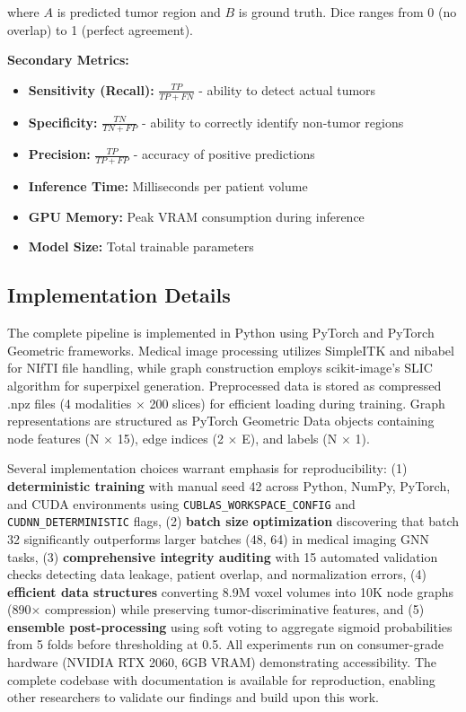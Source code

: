 where $A$ is predicted tumor region and $B$ is ground truth. Dice ranges from 0 (no overlap) to 1 (perfect agreement).

\textbf{Secondary Metrics:}
\begin{itemize}
    \item \textbf{Sensitivity (Recall):} $\frac{TP}{TP + FN}$ - ability to detect actual tumors
    \item \textbf{Specificity:} $\frac{TN}{TN + FP}$ - ability to correctly identify non-tumor regions
    \item \textbf{Precision:} $\frac{TP}{TP + FP}$ - accuracy of positive predictions
    \item \textbf{Inference Time:} Milliseconds per patient volume
    \item \textbf{GPU Memory:} Peak VRAM consumption during inference
    \item \textbf{Model Size:} Total trainable parameters
\end{itemize}


\subsection{Implementation Details}

The complete pipeline is implemented in Python using PyTorch and PyTorch Geometric frameworks. Medical image processing utilizes SimpleITK and nibabel for NIfTI file handling, while graph construction employs scikit-image's SLIC algorithm for superpixel generation. Preprocessed data is stored as compressed .npz files (4 modalities $\times$ 200 slices) for efficient loading during training. Graph representations are structured as PyTorch Geometric Data objects containing node features (N $\times$ 15), edge indices (2 $\times$ E), and labels (N $\times$ 1).

Several implementation choices warrant emphasis for reproducibility: (1) \textbf{deterministic training} with manual seed 42 across Python, NumPy, PyTorch, and CUDA environments using \texttt{CUBLAS\_WORKSPACE\_CONFIG} and \texttt{CUDNN\_DETERMINISTIC} flags, (2) \textbf{batch size optimization} discovering that batch 32 significantly outperforms larger batches (48, 64) in medical imaging GNN tasks, (3) \textbf{comprehensive integrity auditing} with 15 automated validation checks detecting data leakage, patient overlap, and normalization errors, (4) \textbf{efficient data structures} converting 8.9M voxel volumes into 10K node graphs (890$\times$ compression) while preserving tumor-discriminative features, and (5) \textbf{ensemble post-processing} using soft voting to aggregate sigmoid probabilities from 5 folds before thresholding at 0.5. All experiments run on consumer-grade hardware (NVIDIA RTX 2060, 6GB VRAM) demonstrating accessibility. The complete codebase with documentation is available for reproduction, enabling other researchers to validate our findings and build upon this work.

